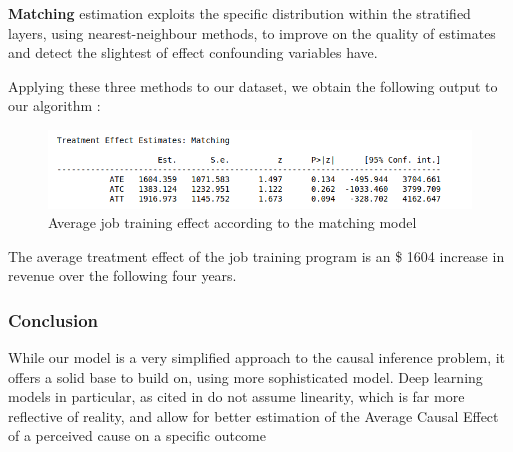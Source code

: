 \documentclass{article}
\begin{document}
\textbf{Matching} estimation exploits the specific distribution within the stratified layers, using nearest-neighbour methods, to improve on the quality of estimates and detect the slightest of effect confounding variables have.

Applying these three methods to our dataset, we obtain the following output to our algorithm : 

\begin{figure}[h]
\small
\centering
\includegraphics[width=0.8 \textwidth]{../figures/matching_estimate.png}
\caption{Average job training effect according to the matching model}
\end{figure}




The average treatment effect of the job training program is an \$ 1604 increase in revenue over the following four years. 

\subsubsection{Conclusion}

While our model is a very simplified approach to the causal inference problem, it offers a solid base to build on, using more sophisticated model. 
Deep learning models in particular, as cited in %
do not assume linearity, which is far more reflective of reality, and allow for better estimation of the Average Causal Effect of a perceived cause on a specific outcome








\newpage
\nocite{*}    %

\end{document}
